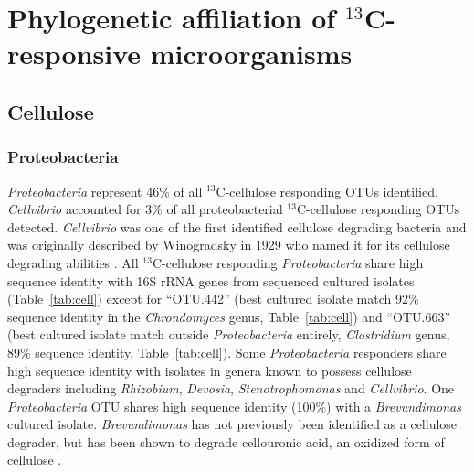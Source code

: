 \documentclass{article}
\begin{document}
\section{Phylogenetic affiliation of $^{13}$C-responsive microorganisms}
\subsection{Cellulose}
\subsubsection{Proteobacteria}\label{cell:proteo}
\textit{Proteobacteria} represent 46\% of all $^{13}$C-cellulose responding
OTUs identified. \textit{Cellvibrio} accounted for 3\% of all proteobacterial
$^{13}$C-cellulose responding OTUs detected. \textit{Cellvibrio} was one of the
first identified cellulose degrading bacteria and was originally described by
Winogradsky in 1929 who named it for its cellulose degrading abilities
\citep{boone2001bergeys}. All $^{13}$C-cellulose responding
\textit{Proteobacteria} share high sequence identity with 16S rRNA genes from
sequenced cultured isolates (Table~\ref{tab:cell}) except for ``OTU.442'' (best
cultured isolate match 92\% sequence identity in the \textit{Chrondomyces}
genus, Table~\ref{tab:cell}) and ``OTU.663'' (best cultured isolate match
outside \textit{Proteobacteria} entirely, \textit{Clostridium} genus, 89\%
sequence identity, Table~\ref{tab:cell}). Some \textit{Proteobacteria}
responders share high sequence identity with isolates in genera known to
possess cellulose degraders including \textit{Rhizobium}, \textit{Devosia},
\textit{Stenotrophomonas} and \textit{Cellvibrio}. One \textit{Proteobacteria}
OTU shares high sequence identity (100\%) with a \textit{Brevundimonas} cultured
isolate.  \textit{Brevundimonas} has not previously been identified as a
cellulose degrader, but has been shown to degrade cellouronic acid, an oxidized
form of cellulose \citep{Tavernier_2008}.
\end{document}
